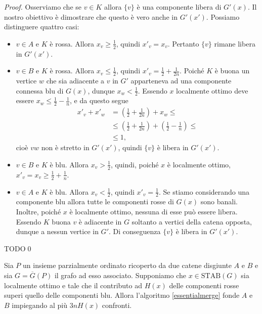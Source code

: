 \begin{proof}
	Osserviamo che se \(v\in K\) allora \(\{v\}\) \`e una componente libera di \(G'(x)\). Il nostro obiettivo \`e dimostrare che questo \`e vero anche in \(G'(x')\). Possiamo distinguere quattro casi: 
	\begin{itemize}
		\item \(v\in A\) e \(K\) \`e rossa. Allora \(x_v\ge\frac{1}{2}\), quindi \(x'_v=x_v\). Pertanto \(\{v\}\) rimane libera in \(G'(x')\). 
		\item \(v\in B\) e \(K\) \`e rossa. Allora \(x_v\le\frac{1}{2}\), quindi \(x'_v=\frac{1}{2}+\frac{1}{2n}\). Poich\'e \(K\) \`e buona un vertice \(w\) che sia adiacente a \(v\) in \(G'\) apparteneva ad una componente connessa blu di \(G(x)\), dunque \(x_w<\frac{1}{2}\). Essendo \(x\) localmente ottimo deve essere \(x_w\le\frac{1}{2}-\frac{1}{n}\), e da questo segue 
		\begin{align}
			x'_v+x'_w &= (\frac{1}{2} + \frac{1}{2n}) + x_w \le \nonumber \\
			&\le (\frac{1}{2} + \frac{1}{2n}) + (\frac{1}{2} - \frac{1}{n}) \le \nonumber \\
			&\le 1\text{,} \nonumber 
		\end{align}
		cio\`e \(vw\) non \`e stretto in \(G'(x')\), quindi \(\{v\}\) \`e libera in \(G'(x')\). 
		\item \(v\in B\) e \(K\) \`e blu. Allora \(x_v>\frac{1}{2}\), quindi, poich\'e \(x\) \`e localmente ottimo, \(x'_v=x_v\ge\frac{1}{2}+\frac{1}{n}\). 
		\item \(v\in A\) e \(K\) \`e blu. Allora \(x_v<\frac{1}{2}\), quindi \(x'_v=\frac{1}{2}\). Se stiamo considerando una componente blu allora tutte le componenti rosse di \(G(x)\) sono banali. Inoltre, poich\'e \(x\) \`e localmente ottimo, nessuna di esse pu\`o essere libera. Essendo \(K\) buona \(v\) \`e adiacente in \(G\) soltanto a vertici della catena opposta, dunque a nessun vertice in \(G'\). Di conseguenza \(\{v\}\) \`e libera in \(G'(x')\). 
	\end{itemize}
	TODO\qed 
\end{proof}
\begin{lemma}
	\label{finallemma} Sia \(P\) un insieme parzialmente ordinato ricoperto da due catene disgiunte \(A\) e \(B\) e sia \(G=\overline{G}(P)\) il grafo ad esso associato. Supponiamo che \(x\in\text{STAB}(G)\) sia localmente ottimo e tale che il contributo ad \(H(x)\) delle componenti rosse superi quello delle componenti blu. Allora l'algoritmo \ref{essentialmerge} fonde \(A\) e \(B\) impiegando al pi\`u \(3nH(x)\) confronti. 
\end{lemma}
